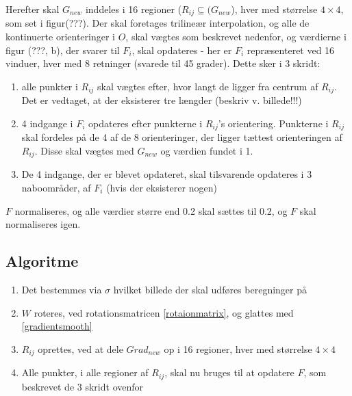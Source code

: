 Herefter skal $G_{new}$ inddeles i 16 regioner ($R_{ij} \subseteq (G_{new}$), hver med størrelse $4\times4$, som set i figur(???). Der skal foretages trilineær interpolation, og alle de kontinuerte orienteringer i $O$, skal vægtes som beskrevet nedenfor, og værdierne i figur (???, b), der svarer til $F_i$, skal opdateres - her er $F_i$ repræsenteret ved 16 vinduer, hver med 8 retninger (svarede til 45 grader). Dette sker i 3 skridt:
\begin{enumerate}
\item{ alle punkter i $R_{ij}$ skal vægtes efter, hvor langt de ligger fra centrum af $R_{ij}$. Det er vedtaget, at der eksisterer tre længder (beskriv v. billede!!!)}
\item{ 4 indgange i $F_i$ opdateres efter punkterne i $R_{ij}$'s orientering. Punkterne i $R_{ij}$ skal fordeles på de 4 af de 8 orienteringer, der ligger tættest orienteringen af $R_{ij}$. Disse skal vægtes med $G_{new}$ og værdien fundet i 1. }
\item{ De 4 indgange, der er blevet opdateret, skal tilsvarende opdateres i 3 naboområder, af $F_i$ (hvis der eksisterer nogen)}
\end{enumerate}

$F$ normaliseres, og alle værdier større end 0.2 skal sættes til 0.2, og $F$ skal normaliseres igen.
\subsection*{Algoritme}
\begin{enumerate}
\item Det bestemmes via $\sigma$ hvilket billede der skal udføres beregninger på
\item $W$ roteres, ved rotationsmatricen \eqref{rotaionmatrix}, og glattes med \eqref{gradientsmooth}
\item $R_{ij}$ oprettes, ved at dele $Grad_{new}$ op i 16 regioner, hver med størrelse $4\times4$
\item Alle punkter, i alle regioner af $R_{ij}$, skal nu bruges til at opdatere $F$, som beskrevet de 3 skridt ovenfor
\end{enumerate}